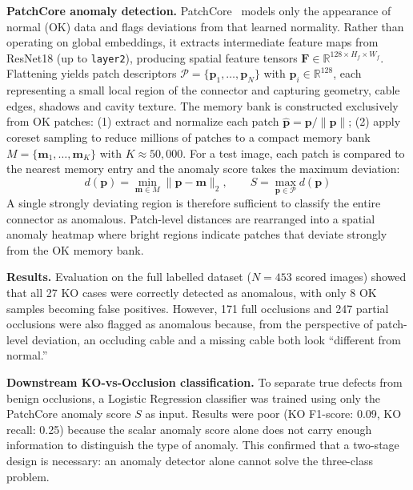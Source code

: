 \documentclass[11pt,a4paper,draft]{article}
\begin{document}
\textbf{PatchCore anomaly detection.} PatchCore~\cite{roth2022patchcore} models only the appearance of normal (OK) data and flags deviations from that learned normality. Rather than operating on global embeddings, it extracts intermediate feature maps from ResNet18 (up to \texttt{layer2}), producing spatial feature tensors $\mathbf{F} \in \mathbb{R}^{128 \times H_f \times W_f}$. Flattening yields patch descriptors $\mathcal{P} = \{\mathbf{p}_1, \dots, \mathbf{p}_N\}$ with $\mathbf{p}_i \in \mathbb{R}^{128}$, each representing a small local region of the connector and capturing geometry, cable edges, shadows and cavity texture. The memory bank is constructed exclusively from OK patches: (1) extract and normalize each patch $\hat{\mathbf{p}} = \mathbf{p} / \|\mathbf{p}\|$; (2) apply coreset sampling to reduce millions of patches to a compact memory bank $M = \{\mathbf{m}_1, \dots, \mathbf{m}_K\}$ with $K \approx 50{,}000$. For a test image, each patch is compared to the nearest memory entry and the anomaly score takes the maximum deviation:
\begin{equation}
    d(\mathbf{p}) = \min_{\mathbf{m} \in M} \|\mathbf{p} - \mathbf{m}\|_2, \qquad S = \max_{\mathbf{p} \in \mathcal{P}} d(\mathbf{p})
\end{equation}
A single strongly deviating region is therefore sufficient to classify the entire connector as anomalous. Patch-level distances are rearranged into a spatial anomaly heatmap where bright regions indicate patches that deviate strongly from the OK memory bank.

\textbf{Results.} Evaluation on the full labelled dataset ($N = 453$ scored images) showed that all 27 KO cases were correctly detected as anomalous, with only 8 OK samples becoming false positives. However, 171 full occlusions and 247 partial occlusions were also flagged as anomalous because, from the perspective of patch-level deviation, an occluding cable and a missing cable both look ``different from normal.''

\textbf{Downstream KO-vs-Occlusion classification.} To separate true defects from benign occlusions, a Logistic Regression classifier was trained using only the PatchCore anomaly score $S$ as input. Results were poor (KO F1-score: 0.09, KO recall: 0.25) because the scalar anomaly score alone does not carry enough information to distinguish the type of anomaly. This confirmed that a two-stage design is necessary: an anomaly detector alone cannot solve the three-class problem.
\end{document}
